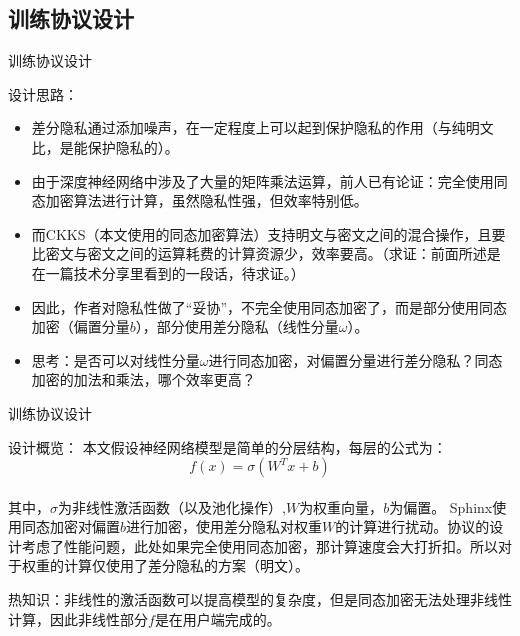 \documentclass{beamer}
\begin{document}
\subsection{训练协议设计}
\begin{frame}{训练协议设计}
\begin{exampleblock}{设计思路：}
\begin{itemize}
		\item {\footnotesize 差分隐私通过添加噪声，在一定程度上可以起到保护隐私的作用（与纯明文比，是能保护隐私的）。}
		\item {\footnotesize 由于深度神经网络中涉及了大量的矩阵乘法运算，前人已有论证：完全使用同态加密算法进行计算，虽然隐私性强，但效率特别低。}
		\item {\footnotesize 而CKKS（本文使用的同态加密算法）支持明文与密文之间的混合操作，且要比密文与密文之间的运算耗费的计算资源少，效率要高。（{\color {blue}求证：前面所述是在一篇技术分享里看到的一段话，待求证。}）}
		\item {\footnotesize 因此，作者对隐私性做了“妥协”，不完全使用同态加密了，而是部分使用同态加密（偏置分量$b$），部分使用差分隐私（线性分量$\omega$）。}
		\item {\footnotesize {\color {blue}思考：是否可以对线性分量$\omega$进行同态加密，对偏置分量进行差分隐私？同态加密的加法和乘法，哪个效率更高？}}

	\end{itemize}
\end{exampleblock}
\end{frame}



\begin{frame}{训练协议设计}
\begin{exampleblock}{设计概览：}
本文假设神经网络模型是简单的分层结构，每层的公式为：\\
\begin{equation*}
f(x)=\sigma(W^Tx+b)
\end{equation*}
\\
其中，$\sigma$为非线性激活函数（以及池化操作）,$W$为权重向量，$b$为偏置。
Sphinx使用同态加密对偏置$b$进行加密，使用差分隐私对权重$W$的计算进行扰动。协议的设计考虑了性能问题，此处如果完全使用同态加密，那计算速度会大打折扣。所以对于权重的计算仅使用了差分隐私的方案（明文）。
\end{exampleblock}
{\color {red} 热知识：非线性的激活函数可以提高模型的复杂度，但是同态加密无法处理非线性计算，因此非线性部分$f$是在用户端完成的。}
\end{frame}
\end{document}
